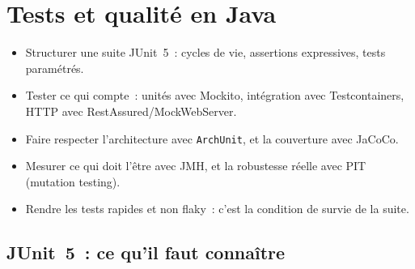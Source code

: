 \chapter{Tests et qualit\'e en Java}
\label{ch-java-tests}

\begin{objectif}
\begin{itemize}
  \item Structurer une suite JUnit~5~: cycles de vie, assertions expressives, tests param\'etr\'es.
  \item Tester ce qui compte~: unit\'es avec Mockito, int\'egration avec Testcontainers, HTTP avec
        RestAssured/MockWebServer.
  \item Faire respecter l'architecture avec \texttt{ArchUnit}, et la couverture avec JaCoCo.
  \item Mesurer ce qui doit l'\^etre avec JMH, et la robustesse r\'eelle avec PIT (mutation testing).
  \item Rendre les tests rapides et non flaky~: c'est la condition de survie de la suite.
\end{itemize}
\end{objectif}

\section{JUnit~5~: ce qu'il faut conna\^itre}


